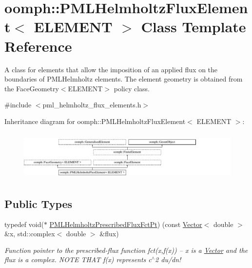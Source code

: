 \hypertarget{classoomph_1_1PMLHelmholtzFluxElement}{}\section{oomph\+:\+:P\+M\+L\+Helmholtz\+Flux\+Element$<$ E\+L\+E\+M\+E\+NT $>$ Class Template Reference}
\label{classoomph_1_1PMLHelmholtzFluxElement}


A class for elements that allow the imposition of an applied flux on the boundaries of P\+M\+L\+Helmholtz elements. The element geometry is obtained from the Face\+Geometry$<$\+E\+L\+E\+M\+E\+N\+T$>$ policy class.  




{\ttfamily \#include $<$pml\+\_\+helmholtz\+\_\+flux\+\_\+elements.\+h$>$}

Inheritance diagram for oomph\+:\+:P\+M\+L\+Helmholtz\+Flux\+Element$<$ E\+L\+E\+M\+E\+NT $>$\+:\begin{figure}[H]
\begin{center}
\leavevmode
\includegraphics[height=2.548350cm]{classoomph_1_1PMLHelmholtzFluxElement}
\end{center}
\end{figure}
\subsection*{Public Types}
\begin{DoxyCompactItemize}
\item 
typedef void($\ast$ \hyperlink{classoomph_1_1PMLHelmholtzFluxElement_af376593418510a6fcbc23cc13f3d6b22}{P\+M\+L\+Helmholtz\+Prescribed\+Flux\+Fct\+Pt}) (const \hyperlink{classoomph_1_1Vector}{Vector}$<$ double $>$ \&x, std\+::complex$<$ double $>$ \&flux)
\begin{DoxyCompactList}\small\item\em Function pointer to the prescribed-\/flux function fct(x,f(x)) -- x is a \hyperlink{classoomph_1_1Vector}{Vector} and the flux is a complex. N\+O\+TE T\+H\+AT f(x) represents c$^\wedge$2 du/dn! \end{DoxyCompactList}\end{DoxyCompactItemize}
